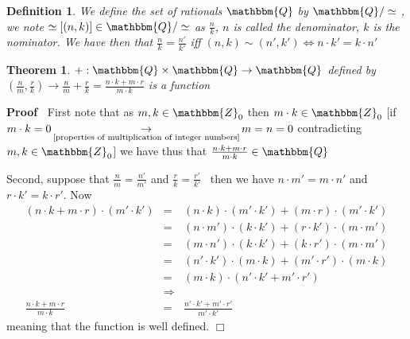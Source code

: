 \documentclass{book}
\newcommand{\Rightarrowlim}{\mathop{\rightarrow}\limits}
\newcommand{\upl}{+}
\newenvironment{proof}{\noindent\textbf{Proof\ }}{\hspace*{\fill}$\Box$\medskip}
\newtheorem{definition}{Definition}
{\theorembodyfont{\rmfamily}\newtheorem{example}{Example}}
\newtheorem{theorem}{Theorem}
\begin{document}
{{\begin{definition}
  \label{n/k}{}{}{}We
  define the set of rationals $\mathbbm{Q}$ by $\mathbbm{Q}/ \simeq$ , we note
  $\simeq [(n, k)] \in \mathbbm{Q}/ \simeq$ as $\frac{n}{k}$, $n$ is called
  the denominator, $k$ is the nominator. We have then that $\frac{n}{k} =
  \frac{n'}{k'}$ iff $(n, k) \sim (n', k') \Leftrightarrow n \cdot k' = k
  \cdot n'$
\end{definition}

\begin{theorem}
  \label{addition of rational numbers}$\upl : \mathbbm{Q} \times \mathbbm{Q}
  \rightarrow \mathbbm{Q}$ defined by $\left( \frac{n}{m}, \frac{r}{k} \right)
  \rightarrow \frac{n}{m} \upl \frac{r}{k} = \frac{n \cdot k + m \cdot r}{m
  \cdot k}$ is a function
\end{theorem}

\begin{proof}
  First note that as $m, k \in \mathbbm{Z}_0$ then $m \cdot k \in
  \mathbbm{Z}_0$ [if $m \cdot k = 0 \Rightarrowlim_{\text{\ref{properties of
  multiplication of integer numbers}}} m = n = 0$ contradicting $m, k \in
  \mathbbm{Z}_0$] we have thus that $\frac{n \cdot k \upl m \cdot r}{m \cdot
  k} \in \mathbbm{Q}$
  
  Second, suppose that $\frac{n}{m} = \frac{n'}{m'}$ and $\frac{r}{k} =
  \frac{r'}{k'}$ \ then we have $n \cdot m' = m \cdot n'$ and $r \cdot k' = k
  \cdot r'$. Now
  \begin{eqnarray*}
    (n \cdot k \upl m \cdot r) \cdot (m' \cdot k') & = & (n \cdot k) \cdot (m'
    \cdot k') \upl (m \cdot r) \cdot (m' \cdot k')\\
    & = & (n \cdot m') \cdot (k \cdot k') \upl (r \cdot k') \cdot (m \cdot
    m')\\
    & = & (m \cdot n') \cdot (k \cdot k') \upl (k \cdot r') \cdot (m \cdot
    m')\\
    & = & (n' \cdot k') \cdot (m \cdot k) + (m' \cdot r') \cdot (m \cdot k)\\
    & = & (m \cdot k) \cdot (n' \cdot k' \upl m' \cdot r')\\
    & \Rightarrow & \\
    \frac{n \cdot k \upl m \cdot r}{m \cdot k} & = & \frac{n' \cdot k' \upl m'
    \cdot r'}{m' \cdot k'}
  \end{eqnarray*}
  meaning that the function is well defined.
\end{proof}

}}
\end{document}
